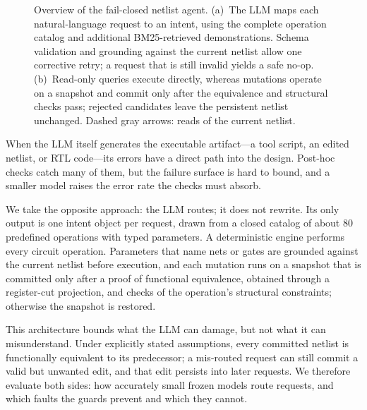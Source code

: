\documentclass[conference,letterpaper]{IEEEtran}
\begin{document}
\begin{figure}[t]
\centering

\caption{Overview of the fail-closed netlist agent. (a)~The LLM maps each
natural-language request to an intent, using the complete operation catalog
and additional BM25-retrieved demonstrations. Schema validation and grounding
against the current netlist allow one corrective retry; a request that is
still invalid yields a safe no-op. (b)~Read-only queries execute directly,
whereas mutations operate on a snapshot and commit only after the equivalence
and structural checks pass; rejected candidates leave the persistent netlist
unchanged. Dashed gray arrows: reads of the current netlist.}
\label{fig:arch}
\end{figure}

When the LLM itself generates the executable artifact---a tool script, an
edited netlist, or RTL code---its errors have a direct path into the design.
Post-hoc checks catch many of them, but the failure surface is hard to bound,
and a smaller model raises the error rate the checks must absorb.

We take the opposite approach: the LLM routes; it does not rewrite. Its only
output is one intent object per request, drawn from a closed catalog of about
80 predefined operations with typed parameters. A deterministic engine
performs every circuit operation. Parameters that name nets or gates are
grounded against the current netlist before execution, and each mutation runs
on a snapshot that is committed only after a proof of functional equivalence,
obtained through a register-cut projection, and checks of the operation's
structural constraints; otherwise the snapshot is restored.

This architecture bounds what the LLM can damage, but not what it can
misunderstand. Under explicitly stated assumptions, every committed netlist is
functionally equivalent to its predecessor; a mis-routed request can still
commit a valid but unwanted edit, and that edit persists into later requests.
We therefore evaluate both sides: how accurately small frozen models route
requests, and which faults the guards prevent and which they cannot.
\end{document}
